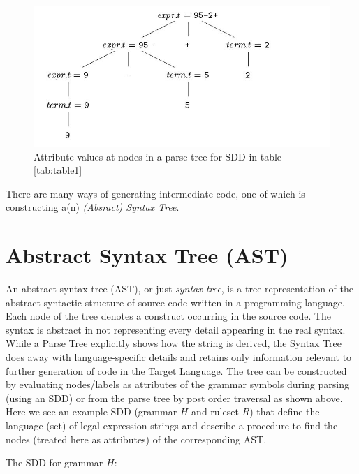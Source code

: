 \documentclass[12pt]{article}
\begin{document}
	\begin{figure}[h!]
		\begin{center}\includegraphics[scale=0.8]{sdd.jpg}\end{center}
		\caption{Attribute values at nodes in a parse tree for SDD in table \ref{tab:table1}}
  		\label{fig:sdd4}
	\end{figure}

	There are many ways of generating intermediate code, one of which is constructing a(n) \emph{(Absract) Syntax Tree}.

\section{Abstract Syntax Tree (AST)}
	An abstract syntax tree (AST), or just \emph{syntax tree}, is a tree representation of the abstract syntactic structure of source code written in a programming language. Each node of the tree denotes a construct occurring in the source code. The syntax is abstract in not representing every detail appearing in the real syntax. While a Parse Tree explicitly shows how the string is derived, the Syntax Tree does away with language-specific details and retains only information relevant to further generation of code in the Target Language. The tree can be constructed by evaluating nodes/labels as attributes of the grammar symbols during parsing (using an SDD) or from the parse tree by post order traversal as shown above. Here we see an example SDD (grammar $H$ and ruleset $R$) that define the language (set) of legal expression strings and describe a procedure to find the nodes (treated here as attributes) of the corresponding AST.

	The SDD for grammar $H$:
\end{document}
